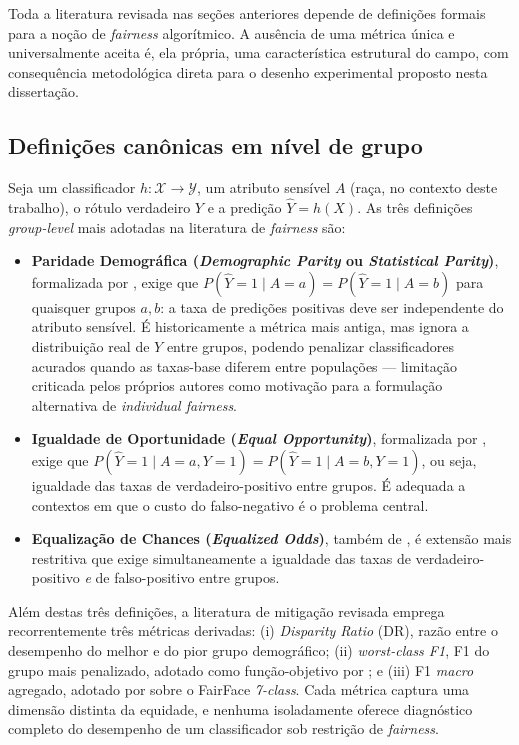 Toda a literatura revisada nas seções anteriores depende de definições formais para a noção de \emph{fairness} algorítmico. A ausência de uma métrica única e universalmente aceita é, ela própria, uma característica estrutural do campo, com consequência metodológica direta para o desenho experimental proposto nesta dissertação.

\subsection{Definições canônicas em nível de grupo}
\label{sec:rl_metricas_defs}

Seja um classificador $h: \mathcal{X} \to \mathcal{Y}$, um atributo sensível $A$ (raça, no contexto deste trabalho), o rótulo verdadeiro $Y$ e a predição $\widehat{Y} = h(X)$. As três definições \emph{group-level} mais adotadas na literatura de \emph{fairness} são:

\begin{itemize}
\item \textbf{Paridade Demográfica (\emph{Demographic Parity} ou \emph{Statistical Parity})}, formalizada por , exige que $P(\widehat{Y} = 1 \mid A = a) = P(\widehat{Y} = 1 \mid A = b)$ para quaisquer grupos $a, b$: a taxa de predições positivas deve ser independente do atributo sensível. É historicamente a métrica mais antiga, mas ignora a distribuição real de $Y$ entre grupos, podendo penalizar classificadores acurados quando as taxas-base diferem entre populações --- limitação criticada pelos próprios autores como motivação para a formulação alternativa de \emph{individual fairness}.

\item \textbf{Igualdade de Oportunidade (\emph{Equal Opportunity})}, formalizada por , exige que $P(\widehat{Y} = 1 \mid A = a, Y = 1) = P(\widehat{Y} = 1 \mid A = b, Y = 1)$, ou seja, igualdade das taxas de verdadeiro-positivo entre grupos. É adequada a contextos em que o custo do falso-negativo é o problema central.

\item \textbf{Equalização de Chances (\emph{Equalized Odds})}, também de , é extensão mais restritiva que exige simultaneamente a igualdade das taxas de verdadeiro-positivo \emph{e} de falso-positivo entre grupos.
\end{itemize}

Além destas três definições, a literatura de mitigação revisada emprega recorrentemente três métricas derivadas: (i) \emph{Disparity Ratio} (DR), razão entre o desempenho do melhor e do pior grupo demográfico; (ii) \emph{worst-class F1}, F1 do grupo mais penalizado, adotado como função-objetivo por ; e (iii) F1 \emph{macro} agregado, adotado por  sobre o FairFace \emph{7-class}. Cada métrica captura uma dimensão distinta da equidade, e nenhuma isoladamente oferece diagnóstico completo do desempenho de um classificador sob restrição de \emph{fairness}.


